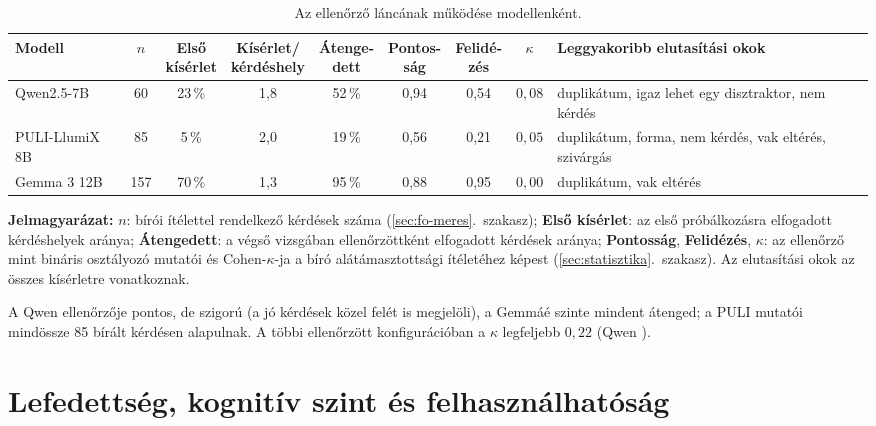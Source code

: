 \begin{table}[htbp]
\centering
\caption{Az  ellenőrző láncának működése modellenként.}
\label{tab:ellenorzo}
\small
\setlength{\tabcolsep}{4pt}
\begin{tabularx}{\textwidth}{@{}lccccccc>{\raggedright\arraybackslash}X@{}}
\toprule
Modell & $n$ & \makecell{Első\\kísérlet} & \makecell{Kísérlet/\\kérdéshely} & \makecell{Átenge-\\dett} & \makecell{Pontos-\\ság} & \makecell{Felidé-\\zés} & $\kappa$ & Leggyakoribb elutasítási okok \\
\midrule
Qwen2.5-7B     & 60  & 23\,\% & 1,8 & 52\,\% & 0,94 & 0,54 & $0{,}08$ & duplikátum, igaz lehet egy disztraktor, nem kérdés \\
PULI-LlumiX 8B & 85  & 5\,\%  & 2,0 & 19\,\% & 0,56 & 0,21 & $0{,}05$ & duplikátum, forma, nem kérdés, vak eltérés, szivárgás \\
Gemma 3 12B    & 157 & 70\,\% & 1,3 & 95\,\% & 0,88 & 0,95 & $0{,}00$ & duplikátum, vak eltérés \\
\bottomrule
\end{tabularx}

\vspace{4pt}
\begin{minipage}{\textwidth}
\footnotesize\noindent\textbf{Jelmagyarázat:}
$n$: bírói ítélettel rendelkező kérdések száma (\ref{sec:fo-meres}.~szakasz);
\textbf{Első kísérlet}: az első próbálkozásra elfogadott kérdéshelyek aránya;
\textbf{Átengedett}: a végső vizsgában ellenőrzöttként elfogadott kérdések aránya;
\textbf{Pontosság}, \textbf{Felidézés}, $\kappa$: az ellenőrző mint bináris osztályozó mutatói és Cohen-$\kappa$-ja a bíró alátámasztottsági ítéletéhez képest (\ref{sec:statisztika}.~szakasz). Az elutasítási okok az összes kísérletre vonatkoznak.
\end{minipage}
\end{table}

A Qwen ellenőrzője pontos, de szigorú (a jó kérdések közel felét is megjelöli), a Gemmáé szinte mindent átenged;
a PULI mutatói mindössze 85 bírált kérdésen alapulnak. A többi ellenőrzött konfigurációban a $\kappa$ legfeljebb
$0{,}22$ (Qwen ).

\section{Lefedettség, kognitív szint és felhasználhatóság}
\label{app-er-jelleg}


